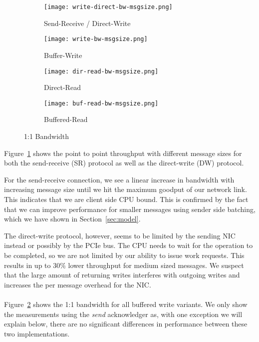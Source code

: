 \begin{figure}[htp]
\begin{subfigure}[b]{0.49\textwidth}
  \centering
  \texttt{[image: write-direct-bw-msgsize.png]}
  \caption{Send-Receive / Direct-Write}
  \label{fig:plot-sr-dw-bw}
\end{subfigure}
\begin{subfigure}[b]{0.49\textwidth}
  \centering
  \texttt{[image: write-bw-msgsize.png]}
  \caption{Buffer-Write}
  \label{fig:plot-bw-bw}
\end{subfigure}
\begin{subfigure}[b]{0.49\textwidth}
  \centering
  \texttt{[image: dir-read-bw-msgsize.png]}
  \caption{Direct-Read}
  \label{fig:plot-dr-bw}
\end{subfigure}
\begin{subfigure}[b]{0.57\textwidth}
  \centering
  \texttt{[image: buf-read-bw-msgsize.png]}
  \caption{Buffered-Read}
  \label{fig:plot-br-bw}
\end{subfigure}
  \caption{1:1 Bandwidth}
  \label{fig:plot-bw}
\end{figure}

Figure~\ref{fig:plot-sr-dw-bw} shows the point to point throughput with different message sizes for both the send-receive (SR)
protocol as well as the direct-write (DW) protocol. 

For the send-receive connection, we see a linear increase in bandwidth with increasing message size until we hit the
maximum goodput of our network link. This indicates that we are client side CPU bound. This is confirmed by the fact that we can
improve performance for smaller messages using sender side batching, which we have shown in Section~\ref{sec:model}.

The direct-write protocol, however, seems to be limited by the sending NIC instead or possibly by the PCIe bus. The CPU needs
to wait for the operation to be completed, so we are not limited by our ability to issue work requests. 
This results in up to 30\% lower throughput for medium sized messages. We suspect that the large 
amount of returning writes interferes with outgoing writes and increases the per message overhead for the NIC. 


\paragraph{} Figure~\ref{fig:plot-bw-bw} shows the 1:1 bandwidth for all buffered write variants. We only show the measurements
using the \emph{send} acknowledger as, with one exception we will explain below, there are no significant differences
in performance between these two implementations.

